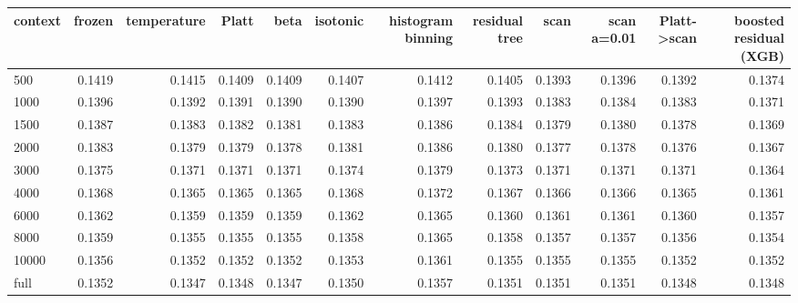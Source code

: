 \begin{tabular}{lrrrrrrrrrrr}
\toprule
context & frozen & temperature & Platt & beta & isotonic & histogram binning & residual tree & scan & scan a=0.01 & Platt->scan & boosted residual (XGB) \\
\midrule
500 & 0.1419 & 0.1415 & 0.1409 & 0.1409 & 0.1407 & 0.1412 & 0.1405 & 0.1393 & 0.1396 & 0.1392 & 0.1374 \\
1000 & 0.1396 & 0.1392 & 0.1391 & 0.1390 & 0.1390 & 0.1397 & 0.1393 & 0.1383 & 0.1384 & 0.1383 & 0.1371 \\
1500 & 0.1387 & 0.1383 & 0.1382 & 0.1381 & 0.1383 & 0.1386 & 0.1384 & 0.1379 & 0.1380 & 0.1378 & 0.1369 \\
2000 & 0.1383 & 0.1379 & 0.1379 & 0.1378 & 0.1381 & 0.1386 & 0.1380 & 0.1377 & 0.1378 & 0.1376 & 0.1367 \\
3000 & 0.1375 & 0.1371 & 0.1371 & 0.1371 & 0.1374 & 0.1379 & 0.1373 & 0.1371 & 0.1371 & 0.1371 & 0.1364 \\
4000 & 0.1368 & 0.1365 & 0.1365 & 0.1365 & 0.1368 & 0.1372 & 0.1367 & 0.1366 & 0.1366 & 0.1365 & 0.1361 \\
6000 & 0.1362 & 0.1359 & 0.1359 & 0.1359 & 0.1362 & 0.1365 & 0.1360 & 0.1361 & 0.1361 & 0.1360 & 0.1357 \\
8000 & 0.1359 & 0.1355 & 0.1355 & 0.1355 & 0.1358 & 0.1365 & 0.1358 & 0.1357 & 0.1357 & 0.1356 & 0.1354 \\
10000 & 0.1356 & 0.1352 & 0.1352 & 0.1352 & 0.1353 & 0.1361 & 0.1355 & 0.1355 & 0.1355 & 0.1352 & 0.1352 \\
full & 0.1352 & 0.1347 & 0.1348 & 0.1347 & 0.1350 & 0.1357 & 0.1351 & 0.1351 & 0.1351 & 0.1348 & 0.1348 \\
\bottomrule
\end{tabular}
